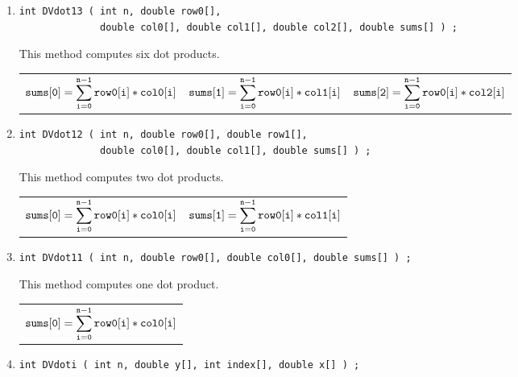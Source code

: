 \begin{enumerate}
\begin{tabular}{l}
\end{tabular}
\item
\begin{verbatim}
int DVdot13 ( int n, double row0[], 
              double col0[], double col1[], double col2[], double sums[] ) ;
\end{verbatim}
This method computes six dot products.
\par
\begin{tabular}{lll}
$\displaystyle{\tt sums[0]}
               = \sum_{\tt i = 0}^{\tt n-1} {\tt row0[i] * col0[i]}$ &
$\displaystyle{\tt sums[1]}
               = \sum_{\tt i = 0}^{\tt n-1} {\tt row0[i] * col1[i]}$ &
$\displaystyle{\tt sums[2]}
               = \sum_{\tt i = 0}^{\tt n-1} {\tt row0[i] * col2[i]}$ 
\end{tabular}
\item
\begin{verbatim}
int DVdot12 ( int n, double row0[], double row1[], 
              double col0[], double col1[], double sums[] ) ;
\end{verbatim}
This method computes two dot products.
\par
\begin{tabular}{ll}
$\displaystyle{\tt sums[0]}
               = \sum_{\tt i = 0}^{\tt n-1} {\tt row0[i] * col0[i]}$ &
$\displaystyle{\tt sums[1]}
               = \sum_{\tt i = 0}^{\tt n-1} {\tt row0[i] * col1[i]}$ 
\end{tabular}
\item
\begin{verbatim}
int DVdot11 ( int n, double row0[], double col0[], double sums[] ) ;
\end{verbatim}
This method computes one dot product.
\par
\begin{tabular}{l}
$\displaystyle{\tt sums[0]}
               = \sum_{\tt i = 0}^{\tt n-1} {\tt row0[i] * col0[i]}$
\end{tabular}
\item
\begin{verbatim}
int DVdoti ( int n, double y[], int index[], double x[] ) ;
\end{verbatim}

\end{enumerate}
